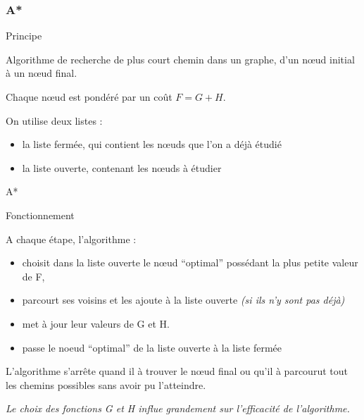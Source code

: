 
\begin{frame}
    \frametitle{A*}

\begin{block}{Principe}

Algorithme de recherche de plus court chemin dans un graphe, d'un nœud initial à un nœud final.

\bigskip


Chaque nœud est pondéré par un coût $F = G + H$.


\bigskip

On utilise deux listes : 

\begin{itemize}
\item la liste fermée, qui contient les nœuds que l'on a déjà étudié

\item la liste ouverte, contenant les nœuds à étudier

\end{itemize}

\end{block}
\end{frame}

\begin{frame}{A*}

\begin{block}{Fonctionnement}

A chaque étape, l'algorithme : 
\begin{itemize}
\item choisit dans la liste ouverte le nœud ``optimal'' possédant la plus petite valeur de F,
\item parcourt ses voisins et les ajoute à la liste ouverte \textit{(si ils n'y sont pas déjà)} 
\item met à jour leur valeurs de G et H.
\item passe le noeud ``optimal'' de la liste ouverte à la liste fermée

\end{itemize}

L'algorithme s'arrête quand il à trouver le nœud final ou qu'il à parcourut tout les chemins possibles sans avoir pu l'atteindre.


\end{block} 

\bigskip


\textit{Le choix des fonctions G et H influe grandement sur l'efficacité de l'algorithme.}

\end{frame}
